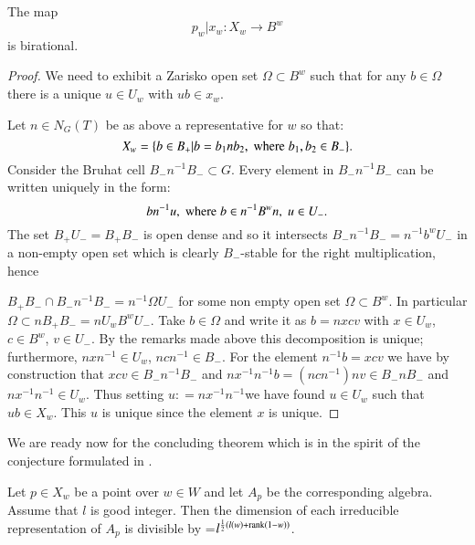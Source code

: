 \begin{prop*}
The map
$$
p_{w}|x_{w} : X_{w}\rightarrow B^{w}
$$
is birational.
\end{prop*}

\begin{proof}
We need to exhibit a Zarisko open set $\Omega \subset B^{w}$ such that for any $b \in \Omega$ there is a unique $u \in U_{w}$ with $ub \in x_{w}$.

Let $n \in N_{G}(T)$ be as above a representative for  $w$ so that:
$$
X_{w} =\{b \in B_{+} |b = b_{1}nb_{2},\; \text{\rm where} \; b_{1}, b_{2} \in B_{-}\}.
$$
Consider the Bruhat cell $B_{-}n^{-1} B_{-}\subset G$. Every element in $B_{-}n^{-1} B_{-}$ can be written uniquely in the form:
$$
bn^{-1}u, \;\text{\rm where}\;  b\in n^{-1}B^{w}n, \; u \in U_{-}.
$$
The set $B_{+}U_{-} = B_{+}B_{-}$ is open dense and so it intersects $B_{-}n^{-1}B_{-}= n^{-1}b^{w}U_{-}$ in a non-empty open set which is clearly $B_{-}$-stable for the right multiplication, hence

\noindent
$B_{+}B_{-}\cap B_{-}n^{-1}B_{-} = n^{-1}\Omega U_{-}$ for some non empty open set $\Omega \subset B^{w}$. In particular $\Omega \subset nB_{+}B_{-} =nU_{w}B^{w}U_{-}$. Take $b\in \Omega$ and write it as $b=nxcv$ with $x\in U_{w}$, $c\in B^{w}$, $v \in U_{-}$. By the remarks made above this decomposition is unique; furthermore, $nxn^{-1}\in U_{w}$, $ncn^{-1} \in B_{-}$. For the element $n^{-1}b = xcv$ we have by construction that $xcv \in B_{-}n^{-1}B_{-}$ and $nx^{-1}n^{-1}b=\left(ncn^{-1}\right)nv \in B_{-}n B_{-}$ and $nx^{-1}n^{-1} \in U_{w}$. Thus setting $u : = nx^{-1}n^{-1}$we have found $u \in U_{w}$ such that $ub \in X_{w}$. This $u$ is unique since the element $x$ is unique.
\end{proof}

We are ready now for the concluding theorem which is in the spirit of the conjecture formulated in \cite{art4-keyDKP1}.

\begin{theorem*}
Let $p\in X_{w}$ be a point over $w \in W $ and let $A_{p}$ be the corresponding algebra. Assume that $l$ is good integer. Then the dimension of each irreducible representation of $A_{p}$ is divisible by =$l^{\frac{1}{2}(l(w)+ \operatorname{rank}(1-w))}$.
\end{theorem*}

